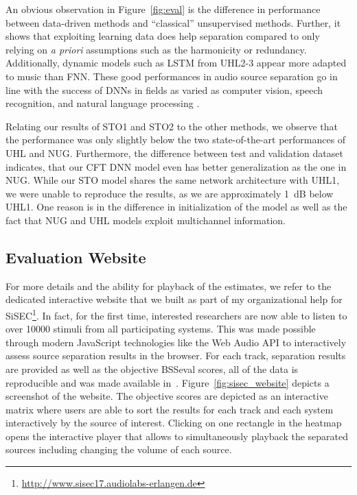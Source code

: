 An obvious observation in Figure~\ref{fig:eval} is the difference in performance between data-driven methods and ``classical'' unsupervised methods. 
Further, it shows that exploiting learning data does help separation compared to only relying on \textit{a priori} assumptions such as the harmonicity or redundancy. 
Additionally, dynamic models such as LSTM from UHL2-3 appear more adapted to music than \acs{FNN}. 
These good performances in audio source separation go in line with the success of \acs{DNN}s in fields as varied as computer vision, speech recognition, and natural language processing \cite{lecun15}.
\par
Relating our results of STO1 and STO2 to the other methods, we observe that the performance was only slightly below the two state-of-the-art performances of UHL and NUG.
Furthermore, the difference between test and validation dataset indicates, that our CFT \acs{DNN} model even has better generalization as the one in NUG. 
While our STO model shares the same network architecture with UHL1, we were unable to reproduce the results, as we are approximately 1~dB below UHL1.
One reason is in the difference in initialization of the model as well as the fact that NUG and UHL models exploit multichannel information. 

\subsection{Evaluation Website}
\label{ssec:evaluation Website}

For more details and the ability for playback of the estimates, we refer to the dedicated interactive website that we built as part of my organizational help for \acs{SiSEC}\footnote{\url{http://www.sisec17.audiolabs-erlangen.de}}.
In fact, for the first time, interested researchers are now able to listen to over 10000 stimuli from all participating systems.
This was made possible through modern JavaScript technologies like the Web Audio API to interactively assess source separation results in the browser.
For each track, separation results are provided as well as the objective BSSeval scores, all of the data is reproducible and was made available in~\cite{oss_sisecwebsite}.
Figure~\ref{fig:sisec_website} depicts a screenshot of the website.
The objective scores are depicted as an interactive matrix where users are able to sort the results for each track and each system interactively by the source of interest.
Clicking on one rectangle in the heatmap opens the interactive player that allows to simultaneously playback the separated sources including changing the volume of each source.

